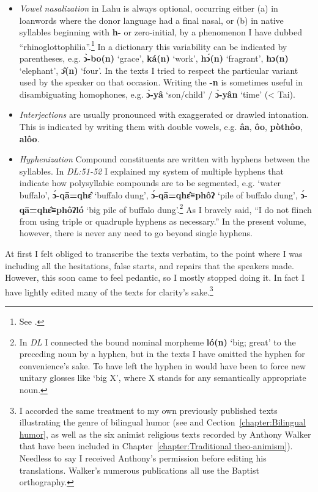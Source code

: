 \begin{itemize}

\item
  \emph{Vowel nasalization} in Lahu is always optional, occurring
  either (a) in loanwords where the donor language had a final nasal,
  or (b) in native syllables beginning with \textbf{h-} or
  zero-initial, by a phenomenon I have dubbed
  ``rhinoglottophilia''.\footnote{See \citet{m75}.} In a dictionary
  this variability can be indicated by parentheses,
  e.g. \textbf{ɔ̀-bo(n)} `grace', \textbf{ká(n) }`work', \textbf{hɔ́(n)
  }`fragrant', \textbf{hɔ(n) }`elephant', \textbf{ɔ̂(n)} `four'. In the
  texts I tried to respect the particular variant used by the speaker
  on that occasion. Writing the \textbf{-n} is sometimes useful in
  disambiguating homophones, e.g. \textbf{ɔ̀-yâ} `son/child' /
  \textbf{ɔ̀-yân} `time' (\textless{} Tai).

\item
  \emph{Interjections }are usually pronounced with exaggerated or
  drawled intonation. This is indicated by writing them with double
  vowels, e.g.  \textbf{âa}, \textbf{ôo}, \textbf{pòthôo},\textbf{
    alôo}.

\item
  \emph{Hyphenization} Compound constituents are written with
  hyphens between the syllables. In \emph{DL:51-52} I explained my
  system of multiple hyphens that indicate how polysyllabic compounds
  are to be segmented, e.g. `water buffalo',
  \textbf{ɔ́-qā=qhɛ̂} `buffalo dung', \textbf{ɔ́-qā=qhɛ̂≡phôʔ} `pile of
  buffalo dung', \textbf{ɔ́-qā=qhɛ̂≡phôʔ\quadruplehyphen ló} `big pile of buffalo
  dung'.\footnote{In \emph{DL} I connected the bound nominal morpheme
    \textbf{ló(n)} `big; great' to the preceding noun by a hyphen, but in the
    texts I have omitted the hyphen for convenience's sake. To have
    left the hyphen in would have been to force new unitary glosses
    like `big X', where X stands for any semantically appropriate
    noun.} As I bravely said, ``I do not flinch from using triple or
  quadruple hyphens as necessary.'' In the present volume, however,
  there is never any need to go beyond single hyphens.

\end{itemize}

At first I felt obliged to transcribe the texts verbatim, to the point
where I was including all the hesitations, false starts, and repairs
that the speakers made. However, this soon came to feel pedantic, so I
mostly stopped doing it. In fact I have lightly edited many of the
texts for clarity's sake.\footnote{I accorded the same treatment to my
  own previously published texts illustrating the genre of bilingual
  humor (see \citet{matisoff1969lahu} and
  Cection~\ref{chapter:Bilingual humor}, as well as the six animist
  religious texts recorded by Anthony Walker that have been included
  in Chapter~\ref{chapter:Traditional theo-animism}). Needless to say
  I received Anthony's permission before editing his
  translations. Walker's numerous publications all use the Baptist
  orthography.}

